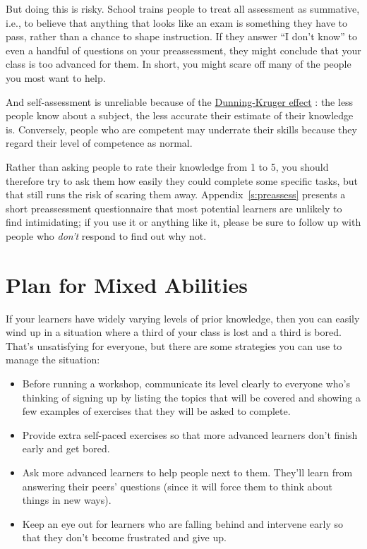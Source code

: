 But doing this is risky. School trains people to treat all assessment as
summative, i.e., to believe that anything that looks like an exam is
something they have to pass, rather than a chance to shape instruction.
If they answer ``I don't know'' to even a handful of questions on your
preassessment, they might conclude that your class is too advanced for
them. In short, you might scare off many of the people you most want to
help.

And self-assessment is unreliable because of the \href{https://en.wikipedia.org/wiki/Dunning\%E2\%80\%93Kruger\_effect}{Dunning-Kruger
effect} \cite{Krug1999}: the less people know
about a subject, the less accurate their estimate of their knowledge
is. Conversely, people who are competent may underrate their skills
because they regard their level of competence as normal.

Rather than asking people to rate their knowledge from 1 to 5, you
should therefore try to ask them how easily they could complete some
specific tasks, but that still runs the risk of scaring them away.
Appendix~\ref{s:preassess} presents a short preassessment questionnaire
that most potential learners are unlikely to find intimidating; if you
use it or anything like it, please be sure to follow up with people who
\emph{don't} respond to find out why not.

\section{Plan for Mixed Abilities}\label{s:classroom-mixed}

If your learners have widely varying levels of prior knowledge, then you
can easily wind up in a situation where a third of your class is lost
and a third is bored. That's unsatisfying for everyone, but there are
some strategies you can use to manage the situation:

\begin{itemize}
\item
  Before running a workshop, communicate its level clearly to everyone
  who's thinking of signing up by listing the topics that will be
  covered and showing a few examples of exercises that they will be
  asked to complete.
\item
  Provide extra self-paced exercises so that more advanced learners
  don't finish early and get bored.
\item
  Ask more advanced learners to help people next to them. They'll
  learn from answering their peers' questions (since it will force
  them to think about things in new ways).
\item
  Keep an eye out for learners who are falling behind and intervene
  early so that they don't become frustrated and give up.
\end{itemize}


